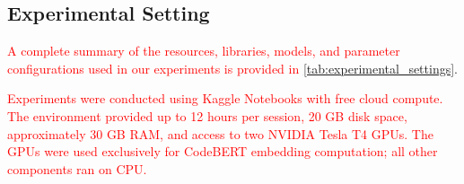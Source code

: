 \documentclass[authoryear,final,5p,times,twocolumn]{elsarticle}
\theoremstyle{plain}
\begin{document}
\subsection{Experimental Setting}
\label{sec:experimental_setting}
\textcolor{red}{A complete summary of the resources, libraries, models, and parameter configurations used in our experiments is provided in \autoref{tab:experimental_settings}}.

\textcolor{red}{Experiments were conducted using Kaggle Notebooks with free cloud compute. The environment provided up to 12 hours per session, 20 GB disk space, approximately 30 GB RAM, and access to two NVIDIA Tesla T4 GPUs. The GPUs were used exclusively for CodeBERT embedding computation; all other components ran on CPU.}

\begin{table}[!htbp]
\centering
\caption{ \textcolor{red}{Hierarchical overview of versions and parameters used in the experimental setting. All parameters not explicitly listed are left at their default values.}}
\label{tab:experimental_settings}
\footnotesize
\setlength{\tabcolsep}{3pt}
\end{table}
\end{document}
